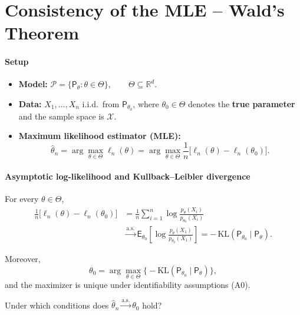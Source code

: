 \chapter{Consistency of the MLE -- Wald's Theorem}

\subsubsection*{Setup}

\begin{itemize}
  \item \textbf{Model:}
  \(
    \mathcal{P} = \{\mathsf{P}_{\theta} : \theta \in \Theta\}, \qquad \Theta \subseteq \mathbb{R}^d .
  \)

  \item \textbf{Data:}
  $X_1,\dots,X_n$ i.i.d.\ from $\mathsf{P}_{\theta_0}$, where $\theta_0 \in \Theta$ denotes the \textbf{true parameter} and the sample space is $\mathcal{X}$.

  \item \textbf{Maximum likelihood estimator (MLE):}
  \[
    \hat{\theta}_n
    =
    \arg\max_{\theta \in \Theta} \ell_n(\theta)
    =
    \arg\max_{\theta \in \Theta} \frac{1}{n}\bigl[\ell_n(\theta)-\ell_n(\theta_0)\bigr].
  \]
\end{itemize}

\subsubsection{Asymptotic log-likelihood and Kullback--Leibler divergence}

For every $\theta \in \Theta$,
\begin{equation*}
\label{eq:lln-kl}
\begin{aligned}
\frac{1}{n}\bigl[\ell_n(\theta)-\ell_n(\theta_0)\bigr]
&=
\frac{1}{n}\sum_{i=1}^n
\log\frac{p_\theta(X_i)}{p_{\theta_0}(X_i)}
\\
&\xrightarrow{\text{a.s.}}
\mathsf{E}_{\theta_0}\!\left[
\log\frac{p_\theta(X_1)}{p_{\theta_0}(X_1)}
\right]
=
-\,\mathrm{KL}(\mathsf{P}_{\theta_0}\mid\mathsf{P}_{\theta}).
\end{aligned}
\end{equation*}

Moreover,
\[
\theta_0
=
\arg\max_{\theta \in \Theta}
\bigl\{-\mathrm{KL}(\mathsf{P}_{\theta_0}\mid\mathsf{P}_{\theta})\bigr\},
\]
and the maximizer is unique under identifiability assumptions (A0).

\medskip

\begin{question}
Under which conditions does
\(
\hat{\theta}_n \xrightarrow{\text{a.s.}} \theta_0
\)
hold?
\end{question}

